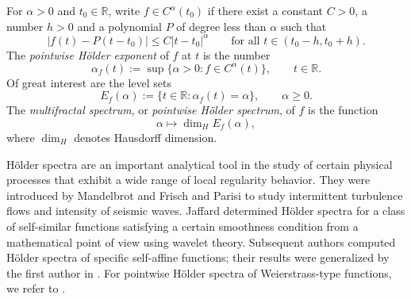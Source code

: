 \documentclass[11pt]{amsart}
\newcommand\RR{\mathbb{R}}
\newcommand{\1}{1}
\begin{document}
For $\alpha>0$ and $t_0\in\RR$, write $f\in C^\alpha(t_0)$ if there exist a constant $C>0$, {a number $h>0$} and a polynomial $P$ of degree less than $\alpha$ such that
\begin{equation}
|f(t)-P(t-t_0)|\leq C|t-t_0|^\alpha \qquad\mbox{for all {$t\in (t_0-h,t_0+h)$}}.
\label{eq:Holder-def}
\end{equation}
The {\em pointwise H\"older exponent} of $f$ at $t$ is the number
\begin{equation*}
\alpha_f(t):=\sup\{\alpha>0: f\in C^\alpha(t)\}, \qquad t\in\RR.
\end{equation*}
Of great interest are the level sets
\[
E_f(\alpha):=\{t\in\RR: \alpha_f(t)=\alpha\}, \qquad \alpha\geq 0.
\]
The {\em multifractal spectrum}, or {\em pointwise H\"older spectrum}, of $f$ is the function
\[
\alpha\mapsto \dim_H E_f(\alpha),
\]
where $\dim_H$ denotes Hausdorff dimension.

H\"older spectra are an important analytical tool in the study of certain physical processes that exhibit a wide range of local regularity behavior. They were introduced by Mandelbrot \cite{Mandelbrot} and Frisch and Parisi \cite{Frisch-Parisi} to study intermittent turbulence flows and intensity of seismic waves. Jaffard \cite{Jaffard1,Jaffard2} determined H\"older spectra for a class of self-similar functions satisfying a certain smoothness condition from a mathematical point of view using wavelet theory. Subsequent authors \cite{BKK,BenSlimane,JafMan,Seuret} computed H\"older spectra of specific self-affine functions; their results were generalized by the first author in \cite{Allaart-2018,Allaart-2020}. For pointwise H\"older spectra of Weierstrass-type functions, we refer to \cite{Otani}.
\end{document}
